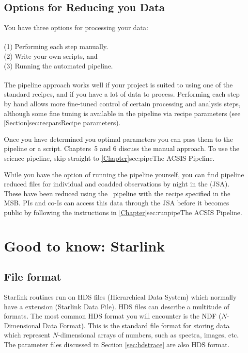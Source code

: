 \documentclass[11pt,oneside,chapters]{starlink}
\begin{document}
\section{Options for Reducing you Data}

You have three options for processing your data:
\\\\
(1) Performing each step manually.\\
(2) Write your own scripts, and \\
(3) Running the automated pipeline.
\\\\
The pipeline approach works well if your project is suited to using
one of the standard recipes, and if you have a lot of data to process.
Performing each step by hand allows more fine-tuned control of certain
processing and analysis steps, although some fine tuning is available
in the pipeline via recipe parameters (see
\cref{Section}{sec:recpars}{Recipe parameters}).

Once you have determined you optimal parameters you can pass them to
the pipeline or a script. Chapters~5 and 6 discuss the manual
approach. To use the science pipeline, skip straight to
\cref{Chapter}{sec:pipe}{The ACSIS Pipeline}.

While you have the option of running the pipeline yourself, you can
find pipeline reduced files for individual and coadded observations by
night in the  (JSA).
These have been reduced using the \oracdr\ pipeline with the recipe
specified in the MSB. PIs and co-Is can access this data through the
JSA before it becomes public by following the instructions in
\cref{Chapter}{sec:runpipe}{The ACSIS Pipeline}.

\newpage
\chapter{Good to know: Starlink}
\label{sec:starlink}

\section{File format}
\label{sec:format}

Starlink routines run on HDS files (Hierarchical Data System) which
normally have a  extension (Starlink Data File). HDS files can
describe a multitude of formats. The most common HDS format you will
encounter is the NDF ($N$-Dimensional Data Format). This is the standard
file format for storing data which represent $N$-dimensional arrays of
numbers, such as spectra, images, etc. The parameter files discussed
in Section \ref{sec:hdstrace} are also HDS format.
\end{document}
